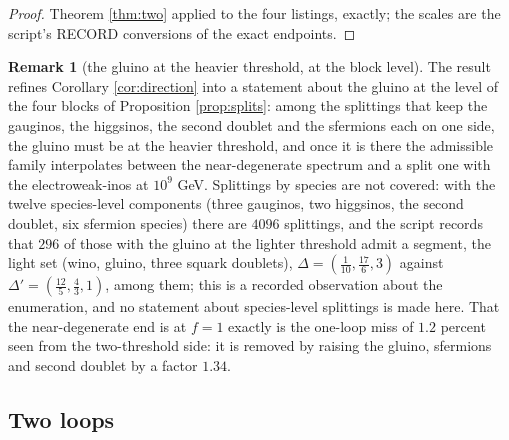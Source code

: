 \documentclass[11pt]{article}
\theoremstyle{definition}
\newtheorem{remark}[theorem]{Remark}
\newcommand{\Dl}{\Delta}
\begin{document}
\begin{proof}
Theorem \ref{thm:two} applied to the four listings, exactly; the scales are the script's RECORD conversions of the exact endpoints.
\end{proof}

\begin{remark}[the gluino at the heavier threshold, at the block level]\label{rem:gluino}
The result refines Corollary \ref{cor:direction} into a statement about the gluino at the level of the four blocks of Proposition \ref{prop:splits}: among the splittings that keep the gauginos, the higgsinos, the second doublet and the sfermions each on one side, the gluino must be at the heavier threshold, and once it is there the admissible family interpolates between the near-degenerate spectrum and a split one with the electroweak-inos at $10^{9}$ GeV. Splittings by species are not covered: with the twelve species-level components (three gauginos, two higgsinos, the second doublet, six sfermion species) there are $4096$ splittings, and the script records that $296$ of those with the gluino at the lighter threshold admit a segment, the light set (wino, gluino, three squark doublets), $\Dl = (\tfrac{1}{10}, \tfrac{17}{6}, 3)$ against $\Dl' = (\tfrac{12}{5}, \tfrac43, 1)$, among them; this is a recorded observation about the enumeration, and no statement about species-level splittings is made here. That the near-degenerate end is at $f = 1$ exactly is the one-loop miss of $1.2$ percent seen from the two-threshold side: it is removed by raising the gluino, sfermions and second doublet by a factor $1.34$.
\end{remark}


\subsection{Two loops}\label{subsec:twoloop}
\end{document}
